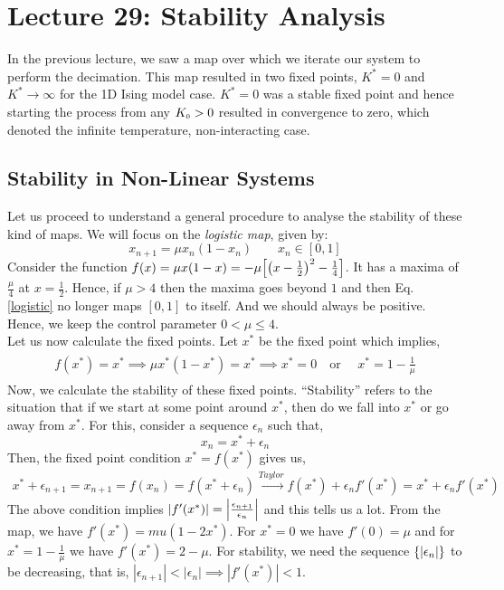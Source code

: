 \section*{Lecture 29: Stability Analysis}
In the previous lecture, we saw a map over which we iterate our system to perform the decimation. This map resulted in two fixed points, $K^*=0$ and $K^*\to \infty$ for the 1D Ising model case. $K^*=0$ was a stable fixed point and hence starting the process from any $K_{\text{\tiny 0}}>0$ resulted in convergence to zero, which denoted the infinite temperature, non-interacting case. 
\subsection{Stability in Non-Linear Systems}
Let us proceed to understand a general procedure to analyse the stability of these kind of maps. We will focus on the \textit{logistic map}, given by:
\begin{equation}\label{logistic}
    x_{n+1} = \mu x_n (1-x_n) \qquad x_n \in [0,1]
\end{equation}
Consider the function $f(x) =\mu x(1-x) = -\mu \qty[\qty(x-\frac{1}{2})^2-\frac{1}{4}]$. It has a maxima of $\frac{\mu}{4}$ at $x=\frac{1}{2}$. Hence, if $\mu>4$ then the maxima goes beyond $1$ and then Eq. \eqref{logistic} no longer maps $[0,1]$ to itself. And we should always be positive. Hence, we keep the control parameter $0< \mu \leq 4$.\\[0.2cm]
Let us now calculate the fixed points. Let $x^*$ be the fixed point which implies, 
\begin{align}
    \begin{split}
        f(x^*) = x^* \implies \mu x^* (1-x^*) = x^* \implies x^* = 0 \quad \text{or } \quad x^* = 1-\frac{1}{\mu}
    \end{split}
\end{align} 
Now, we calculate the stability of these fixed points. ``Stability'' refers to the situation that if we start at some point around $x^*$, then do we fall into $x^*$ or go away from $x^*$. For this, consider a sequence $\epsilon_n$ such that, 
$$x_n = x^* + \epsilon_n$$
Then, the fixed point condition $x^* = f(x^*)$ gives us,
\begin{align*}
  x^*+\epsilon_{n+1} = x_{n+1} = f(x_n) = f(x^*+\epsilon_n) \xrightarrow{Taylor} f(x^*) + \epsilon_n f'(x^*) =  x^* +  \epsilon_n f'(x^*)
\end{align*}
The above condition implies $\abs{f'(x^*) }=\abs{ \frac{\epsilon_{n+1}}{\epsilon_n}}$ and this tells us a lot. From the map, we have $f'(x^*) = mu (1-2x^*)$. For $x^*=0$ we have $f'(0) = \mu$ and for $x^*=1-\frac{1}{\mu}$ we have $f'(x^*)=2-\mu$. For stability, we need the sequence $\{\abs{\epsilon_n}\}$ to be decreasing, that is, $|\epsilon_{n+1}|<|\epsilon_n| \implies |f'(x^*)|<1$. \\[0.2cm]
